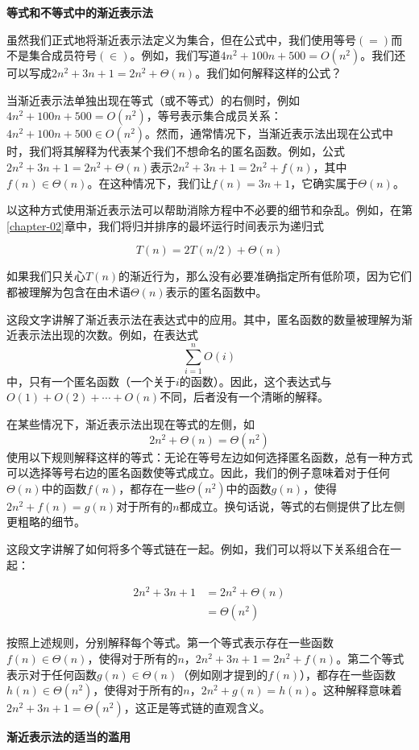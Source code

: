 \documentclass[lang=cn,newtx,10pt,scheme=chinese]{elegantbook}
\begin{document}
\textbf{等式和不等式中的渐近表示法}

虽然我们正式地将渐近表示法定义为集合，但在公式中，我们使用等号$(=)$而不是集合成员符号$(\in)$。例如，我们写道$4n^2+100n+500=O(n^2)$。我们还可以写成$2n^2+3n+1=2n^2+\Theta(n)$。我们如何解释这样的公式？

当渐近表示法单独出现在等式（或不等式）的右侧时，例如$4n^2+100n+500=O(n^2)$，等号表示集合成员关系：$4n^2+100n+500 \in O(n^2)$。然而，通常情况下，当渐近表示法出现在公式中时，我们将其解释为代表某个我们不想命名的匿名函数。例如，公式$2n^2+3n+1=2n^2+\Theta(n)$表示$2n^2+3n+1=2n^2+f(n)$，其中$f(n) \in \Theta(n)$。在这种情况下，我们让$f(n)=3n+1$，它确实属于$\Theta(n)$。

以这种方式使用渐近表示法可以帮助消除方程中不必要的细节和杂乱。例如，在第\ref{chapter-02}章中，我们将归并排序的最坏运行时间表示为递归式

$$
T(n)=2T(n/2)+\Theta(n)
$$

如果我们只关心$T(n)$的渐近行为，那么没有必要准确指定所有低阶项，因为它们都被理解为包含在由术语$\Theta(n)$表示的匿名函数中。

这段文字讲解了渐近表示法在表达式中的应用。其中，匿名函数的数量被理解为渐近表示法出现的次数。例如，在表达式$$\sum_{i=1}^n O(i)$$中，只有一个匿名函数（一个关于$i$的函数）。因此，这个表达式与$O(1)+O(2)+\cdots+O(n)$不同，后者没有一个清晰的解释。

在某些情况下，渐近表示法出现在等式的左侧，如$$2 n^2+\Theta(n)=\Theta(n^2)$$使用以下规则解释这样的等式：无论在等号左边如何选择匿名函数，总有一种方式可以选择等号右边的匿名函数使等式成立。因此，我们的例子意味着对于任何$\Theta(n)$中的函数$f(n)$，都存在一些$\Theta(n^2)$中的函数$g(n)$，使得$2 n^2+f(n)=g(n)$对于所有的$n$都成立。换句话说，等式的右侧提供了比左侧更粗略的细节。

这段文字讲解了如何将多个等式链在一起。例如，我们可以将以下关系组合在一起：

$$
\begin{aligned}
2 n^2+3 n+1 & =2 n^2+\Theta(n) \\
& =\Theta(n^2)
\end{aligned}
$$

按照上述规则，分别解释每个等式。第一个等式表示存在一些函数$f(n) \in \Theta(n)$，使得对于所有的$n$，$2 n^2+3 n+1=2 n^2+f(n)$。第二个等式表示对于任何函数$g(n) \in \Theta(n)$（例如刚才提到的$f(n)$），都存在一些函数$h(n) \in \Theta(n^2)$，使得对于所有的$n$，$2 n^2+g(n)=h(n)$。这种解释意味着$2 n^2+3 n+1=\Theta(n^2)$，这正是等式链的直观含义。

\textbf{渐近表示法的适当的滥用}
\end{document}
